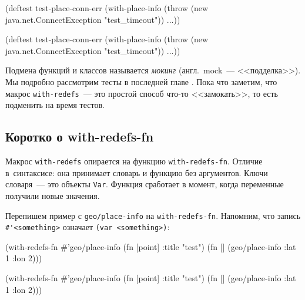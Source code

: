 \begin{english}
  \begin{clojure}
(deftest test-place-conn-err
  (with-place-info
    (throw (new java.net.ConnectException
             "test_timeout"))
    ...))
  \end{clojure}
\end{english}

\else

\begin{english}
  \begin{clojure}
(deftest test-place-conn-err
  (with-place-info
    (throw (new java.net.ConnectException "test_timeout"))
    ...))
  \end{clojure}
\end{english}

\fi


Подмена функций и классов называется \emph{мокинг} (англ.~mock~--- <<подделка>>). Мы
подробно рассмотрим тесты в последней главе . Пока что
заметим, что макрос \verb|with-redefs|~--- это простой способ что-то <<замокать>>,
то есть подменить на время тестов.

\subsection{Коротко о with-redefs-fn}


Макрос \verb|with-redefs| опирается на функцию \verb|with-redefs-fn|. Отличие
в~синтаксисе: она принимает словарь и функцию без аргументов. Ключи словаря~---
это объекты \verb|Var|. Функция сработает в момент, когда переменные получили
новые значения.

Перепишем пример с \verb|geo/place-info| на \verb|with-redefs-fn|. Напомним, что
запись \verb|#'|\texttt{<some\-thing>} означает \verb|(var <something>)|:

\ifx\DEVICETYPE\MOBILE

\begin{english}
  \begin{clojure}
(with-redefs-fn
  {#'geo/place-info (fn [point]
                      {:title "test"})}
  (fn []
    (geo/place-info {:lat 1 :lon 2})))
  \end{clojure}
\end{english}

\else

\begin{english}
  \begin{clojure}
(with-redefs-fn
  {#'geo/place-info (fn [point] {:title "test"})}
  (fn []
    (geo/place-info {:lat 1 :lon 2})))
  \end{clojure}
\end{english}

